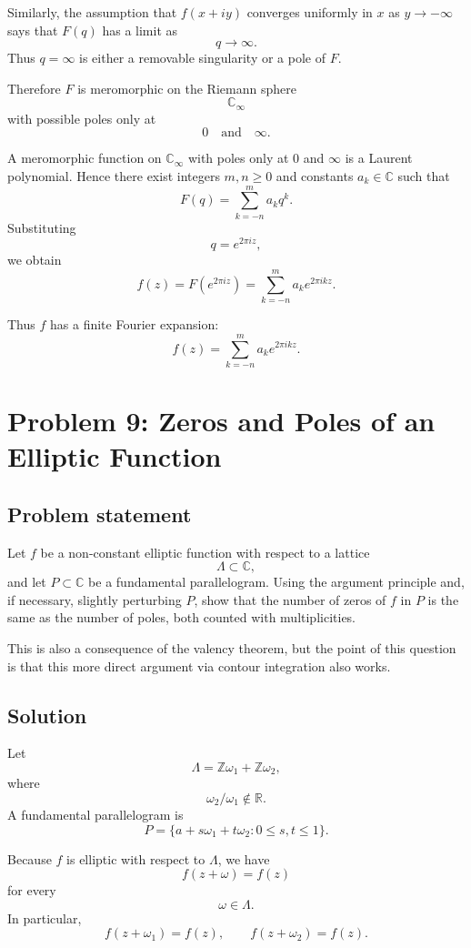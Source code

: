 \documentclass[12pt,a4paper]{article}
\theoremstyle{notespace}
\begin{document}
Similarly, the assumption that \(f(x+iy)\) converges uniformly in \(x\) as
\(y\to-\infty\) says that \(F(q)\) has a limit as
\[
q\to\infty.
\]
Thus \(q=\infty\) is either a removable singularity or a pole of \(F\).

Therefore \(F\) is meromorphic on the Riemann sphere
\[
\mathbb C_\infty
\]
with possible poles only at
\[
0
\quad\text{and}\quad
\infty.
\]

A meromorphic function on \(\mathbb C_\infty\) with poles only at \(0\) and
\(\infty\) is a Laurent polynomial. Hence there exist integers \(m,n\geq 0\)
and constants \(a_k\in\mathbb C\) such that
\[
F(q)=\sum_{k=-n}^{m}a_kq^k.
\]
Substituting
\[
q=e^{2\pi i z},
\]
we obtain
\[
f(z)
=
F(e^{2\pi i z})
=
\sum_{k=-n}^{m}a_k e^{2\pi i kz}.
\]

Thus \(f\) has a finite Fourier expansion:
\[
\boxed{
	f(z)=\sum_{k=-n}^{m}a_k e^{2\pi i kz}.
}
\]

\section{Problem 9: Zeros and Poles of an Elliptic Function}

\subsection*{Problem statement}

Let \(f\) be a non-constant elliptic function with respect to a lattice
\[
\Lambda\subset\mathbb C,
\]
and let \(P\subset\mathbb C\) be a fundamental parallelogram. Using the
argument principle and, if necessary, slightly perturbing \(P\), show that
the number of zeros of \(f\) in \(P\) is the same as the number of poles, both
counted with multiplicities.

This is also a consequence of the valency theorem, but the point of this
question is that this more direct argument via contour integration also works.

\subsection*{Solution}

Let
\[
\Lambda=\mathbb Z\omega_1+\mathbb Z\omega_2,
\]
where
\[
\omega_2/\omega_1\notin\mathbb R.
\]
A fundamental parallelogram is
\[
P=\{a+s\omega_1+t\omega_2:0\leq s,t\leq 1\}.
\]

Because \(f\) is elliptic with respect to \(\Lambda\), we have
\[
f(z+\omega)=f(z)
\]
for every
\[
\omega\in\Lambda.
\]
In particular,
\[
f(z+\omega_1)=f(z),
\qquad
f(z+\omega_2)=f(z).
\]
\end{document}
